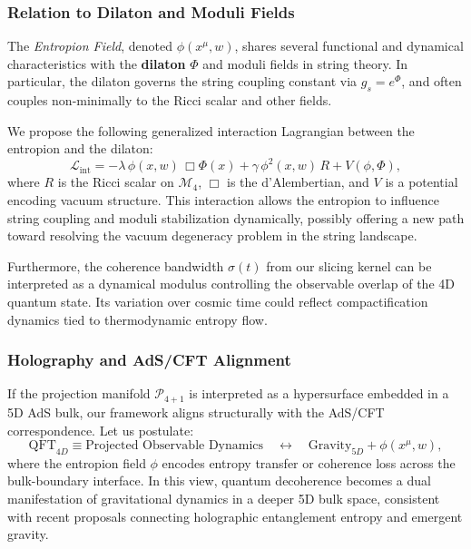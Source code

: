\documentclass[12pt]{article}
\begin{document}
\subsubsection*{Relation to Dilaton and Moduli Fields}

The \emph{Entropion Field}, denoted \( \phi(x^\mu, w) \), shares several functional and dynamical characteristics with the \textbf{dilaton} \( \Phi \) and moduli fields in string theory. In particular, the dilaton governs the string coupling constant via \( g_s = e^{\Phi} \), and often couples non-minimally to the Ricci scalar and other fields.

We propose the following generalized interaction Lagrangian between the entropion and the dilaton:
\begin{equation}
\mathcal{L}_{\text{int}} = -\lambda \, \phi(x, w) \, \Box \Phi(x) + \gamma \, \phi^2(x, w) \, R + V(\phi, \Phi),
\label{eq:entropion_dilaton}
\end{equation}
where \( R \) is the Ricci scalar on \( \mathcal{M}_4 \), \( \Box \) is the d'Alembertian, and \( V \) is a potential encoding vacuum structure. This interaction allows the entropion to influence string coupling and moduli stabilization dynamically, possibly offering a new path toward resolving the vacuum degeneracy problem in the string landscape.

Furthermore, the coherence bandwidth \( \sigma(t) \) from our slicing kernel can be interpreted as a dynamical modulus controlling the observable overlap of the 4D quantum state. Its variation over cosmic time could reflect compactification dynamics tied to thermodynamic entropy flow.

\subsubsection*{Holography and AdS/CFT Alignment}

If the projection manifold \( \mathcal{P}_{4+1} \) is interpreted as a hypersurface embedded in a 5D AdS bulk, our framework aligns structurally with the AdS/CFT correspondence. Let us postulate:
\begin{equation}
\text{QFT}_{4D} \equiv \text{Projected Observable Dynamics} \quad \longleftrightarrow \quad \text{Gravity}_{5D} + \phi(x^\mu, w),
\end{equation}
where the entropion field \( \phi \) encodes entropy transfer or coherence loss across the bulk-boundary interface. In this view, quantum decoherence becomes a dual manifestation of gravitational dynamics in a deeper 5D bulk space, consistent with recent proposals connecting holographic entanglement entropy and emergent gravity.
\end{document}
